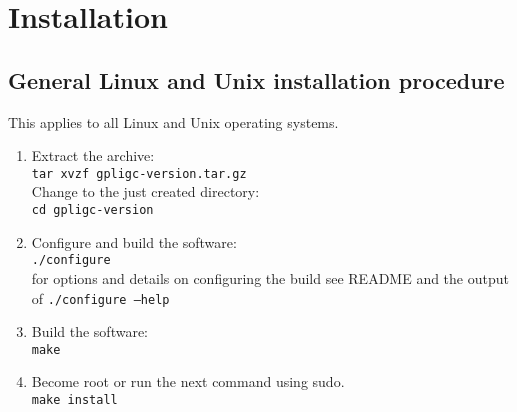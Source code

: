 \section{Installation}

\subsection{General Linux and Unix installation procedure}
\label{unix_install}
\label{linux_install}

This applies to all Linux and Unix operating systems.

\begin{enumerate}

\item Extract the archive: \\
\texttt{tar xvzf gpligc-version.tar.gz} \\
Change to the just created directory: \\
\texttt{cd gpligc-version} 

\item Configure and build the software:\\
\texttt{./configure}\\
for options and details on configuring the build see README and the output of \texttt{./configure --help}

\item Build the software:\\
\texttt{make}

\item  \label{root}
Become root or run the next command using sudo.\\
\texttt{make install} %



\end{enumerate}
